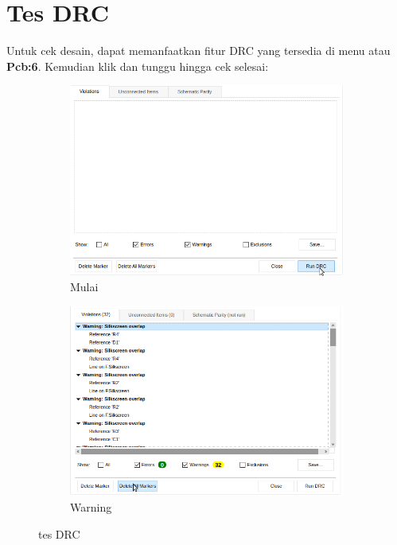 \documentclass[12pt]{book}
\begin{document}
	\section{Tes DRC}
	Untuk cek desain, dapat memanfaatkan fitur DRC yang tersedia di menu  atau \textbf{Pcb:6}.
	Kemudian klik  dan tunggu hingga cek selesai:
	\begin{figure}[!ht]
		\centering
		\begin{subfigure}[t]{0.4\textwidth}
			\includegraphics[width=\textwidth]{images/pcb/drc_0}
			\caption{Mulai}
		\end{subfigure}
		\begin{subfigure}[t]{0.4\textwidth}
			\includegraphics[width=\textwidth]{images/pcb/drc_1}
			\caption{Warning}
		\end{subfigure}
		\caption{tes DRC}
	\end{figure}
\end{document}
